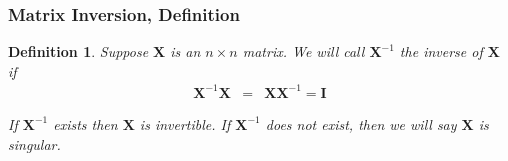 \documentclass{beamer}
\newtheorem{defn}{Definition}
\numberwithin{equation}{section}
\begin{document}
\begin{frame}
\frametitle{Matrix Inversion, Definition}



\begin{defn} Suppose $\boldsymbol{X}$ is an $n \times n$ matrix.  We will call $\boldsymbol{X}^{-1}$ the \alert{inverse} of $\boldsymbol{X}$ if
\begin{eqnarray}
\boldsymbol{X}^{-1} \boldsymbol{X} & = & \boldsymbol{X} \boldsymbol{X}^{-1} = \boldsymbol{I} \nonumber 
\end{eqnarray}

If $\boldsymbol{X}^{-1}$ exists then $\boldsymbol{X}$ is invertible.  If $\boldsymbol{X}^{-1}$ does not exist, then we will say $\boldsymbol{X}$ is \alert{singular}.  
\end{defn}

\end{frame}
\end{document}
